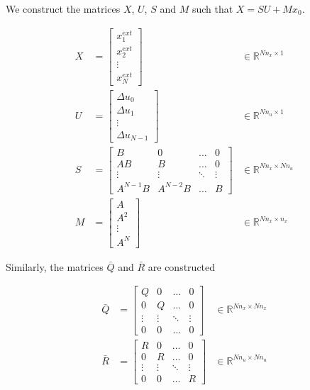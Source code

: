 \documentclass{article}
\begin{document}
We construct the matrices $X$, $U$, $S$ and $M$ such that $X = SU + Mx_0$.

$$
\begin{aligned}
  X &=
  \begin{bmatrix}
    x_1^{ext} \\
    x_2^{ext} \\
    \vdots \\
    x_N^{ext}
  \end{bmatrix} & \in \mathbb{R}^{Nn_x \times 1} \\
  U &=
  \begin{bmatrix}
    \Delta u_0 \\
    \Delta u_1 \\
    \vdots \\
    \Delta u_{N-1}
  \end{bmatrix} & \in \mathbb{R}^{Nn_u \times 1} \\
  S &=
  \begin{bmatrix}
    B & 0 & \ldots & 0 \\
    AB & B & \ldots & 0 \\
    \vdots & \vdots & \ddots & \vdots \\
    A^{N-1} B & A^{N-2} B & \ldots & B
  \end{bmatrix} & \in \mathbb{R}^{Nn_x \times Nn_u} \\
  M &=
  \begin{bmatrix}
    A \\
    A^2 \\
    \vdots \\
    A^N
  \end{bmatrix} & \in \mathbb{R}^{Nn_x \times n_x}
\end{aligned}
$$

Similarly, the matrices $\bar{Q}$ and $\bar{R}$ are constructed

$$
\begin{aligned}
  \bar{Q} &=
  \begin{bmatrix}
    Q & 0 & \ldots & 0 \\
    0 & Q & \ldots & 0 \\
    \vdots & \vdots & \ddots & \vdots \\
    0 & 0 & \ldots & 0
  \end{bmatrix} & \in \mathbb{R}^{Nn_x \times Nn_x} \\
  \bar{R} &=
  \begin{bmatrix}
    R & 0 & \ldots & 0 \\
    0 & R & \ldots & 0 \\
    \vdots & \vdots & \ddots & \vdots \\
    0 & 0 & \ldots & R
  \end{bmatrix} & \in \mathbb{R}^{Nn_u \times Nn_u}
\end{aligned}
$$
\end{document}
